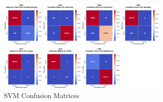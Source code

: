         \clearpage
    
        
        \begin{figure}[H]
        
            \centering
            
            \begin{minipage}{\textwidth}
                \centering
                \begin{minipage}[c]{\textwidth}
                    \centering
                    \includegraphics[width=0.75\textwidth]{../figures/plots/section2/SVM_confusion_matrices.png}
                    \caption{SVM Confusion Matrices}
                    \label{fig:}
                \end{minipage}%
            \end{minipage}

            \vspace{0.5cm}  %
            

\end{figure}
